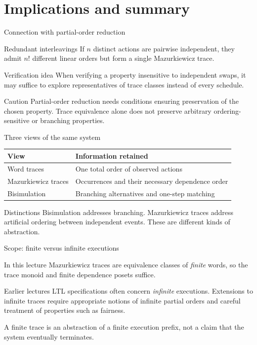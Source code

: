 \documentclass[t,11pt]{beamer}
\begin{document}
\section{Implications and summary}

\begin{frame}{Connection with partial-order reduction}
  \begin{block}{Redundant interleavings}
    If $n$ distinct actions are pairwise independent, they admit $n!$ different linear orders but form a single Mazurkiewicz trace.
  \end{block}
  \begin{block}{Verification idea}
    When verifying a property insensitive to independent swaps, it may suffice to explore representatives of trace classes instead of every schedule.
  \end{block}
  \begin{block}{Caution}
    Partial-order reduction needs conditions ensuring preservation of the chosen property. Trace equivalence alone does not preserve arbitrary ordering-sensitive or branching properties.
  \end{block}
\end{frame}

\begin{frame}{Three views of the same system}
  \begin{center}
  \renewcommand{\arraystretch}{1.4}
  \begin{tabular}{p{}|p{}}
    \textbf{View} & \textbf{Information retained}\\ \hline
    Word traces & One total order of observed actions\\
    Mazurkiewicz traces & Occurrences and their necessary dependence order\\
    Bisimulation & Branching alternatives and one-step matching
  \end{tabular}
  \end{center}
  \begin{block}{Distinctions}
    Bisimulation addresses branching. Mazurkiewicz traces address artificial ordering between independent events. These are different kinds of abstraction.
  \end{block}
\end{frame}

\begin{frame}{Scope: finite versus infinite executions}
  \begin{block}{In this lecture}
    Mazurkiewicz traces are equivalence classes of \emph{finite} words, so the trace monoid and finite dependence posets suffice.
  \end{block}
  \begin{block}{Earlier lectures}
    LTL specifications often concern \emph{infinite} executions. Extensions to infinite traces require appropriate notions of infinite partial orders and careful treatment of properties such as fairness.
  \end{block}
  \vspace{0.25cm}
  A finite trace is an abstraction of a finite execution prefix, not a claim that the system eventually terminates.
\end{frame}
\end{document}
